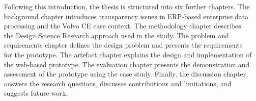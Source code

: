 Following this introduction, the thesis is structured into six further chapters. The background chapter introduces transparency issues in ERP-based enterprise data processing and the Volvo CE case context. The methodology chapter describes the Design Science Research approach used in the study. The problem and requirements chapter defines the design problem and presents the requirements for the prototype. The artefact chapter explains the design and implementation of the web-based prototype. The evaluation chapter presents the demonstration and assessment of the prototype using the case study. Finally, the discussion chapter answers the research questions, discusses contributions and limitations, and suggests future work.


























